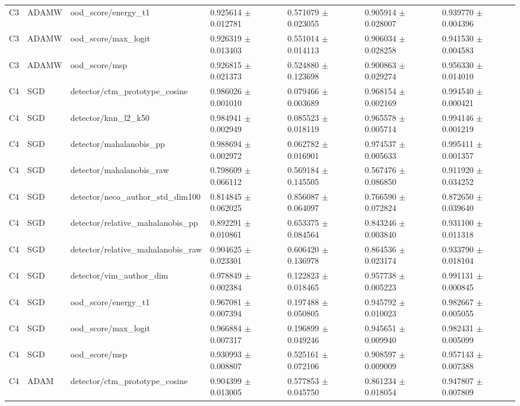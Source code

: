 \begin{longtable}{lllllll}
C3 & ADAMW & ood\_score/energy\_t1 & 0.925614 $\pm$ 0.012781 & 0.571079 $\pm$ 0.023055 & 0.905914 $\pm$ 0.028007 & 0.939770 $\pm$ 0.004396 \\
C3 & ADAMW & ood\_score/max\_logit & 0.926319 $\pm$ 0.013403 & 0.551014 $\pm$ 0.014113 & 0.906034 $\pm$ 0.028258 & 0.941530 $\pm$ 0.004583 \\
C3 & ADAMW & ood\_score/msp & 0.926815 $\pm$ 0.021373 & 0.524880 $\pm$ 0.123698 & 0.900863 $\pm$ 0.029274 & 0.956330 $\pm$ 0.014010 \\
C4 & SGD & detector/ctm\_prototype\_cosine & 0.986026 $\pm$ 0.001010 & 0.079466 $\pm$ 0.003689 & 0.968154 $\pm$ 0.002169 & 0.994540 $\pm$ 0.000421 \\
C4 & SGD & detector/knn\_l2\_k50 & 0.984941 $\pm$ 0.002949 & 0.085523 $\pm$ 0.018119 & 0.965578 $\pm$ 0.005714 & 0.994146 $\pm$ 0.001219 \\
C4 & SGD & detector/mahalanobis\_pp & 0.988694 $\pm$ 0.002972 & 0.062782 $\pm$ 0.016901 & 0.974537 $\pm$ 0.005633 & 0.995411 $\pm$ 0.001357 \\
C4 & SGD & detector/mahalanobis\_raw & 0.798609 $\pm$ 0.066112 & 0.569184 $\pm$ 0.145505 & 0.567476 $\pm$ 0.086850 & 0.911920 $\pm$ 0.034252 \\
C4 & SGD & detector/neco\_author\_std\_dim100 & 0.814845 $\pm$ 0.062025 & 0.856087 $\pm$ 0.064097 & 0.766590 $\pm$ 0.072824 & 0.872650 $\pm$ 0.039640 \\
C4 & SGD & detector/relative\_mahalanobis\_pp & 0.892291 $\pm$ 0.010861 & 0.653375 $\pm$ 0.084564 & 0.843246 $\pm$ 0.003840 & 0.931100 $\pm$ 0.011318 \\
C4 & SGD & detector/relative\_mahalanobis\_raw & 0.904625 $\pm$ 0.023301 & 0.606420 $\pm$ 0.136978 & 0.864536 $\pm$ 0.023174 & 0.933790 $\pm$ 0.018104 \\
C4 & SGD & detector/vim\_author\_dim & 0.978849 $\pm$ 0.002384 & 0.122823 $\pm$ 0.018465 & 0.957738 $\pm$ 0.005223 & 0.991131 $\pm$ 0.000845 \\
C4 & SGD & ood\_score/energy\_t1 & 0.967081 $\pm$ 0.007394 & 0.197488 $\pm$ 0.050805 & 0.945792 $\pm$ 0.010023 & 0.982667 $\pm$ 0.005055 \\
C4 & SGD & ood\_score/max\_logit & 0.966884 $\pm$ 0.007317 & 0.196899 $\pm$ 0.049246 & 0.945651 $\pm$ 0.009940 & 0.982431 $\pm$ 0.005099 \\
C4 & SGD & ood\_score/msp & 0.930993 $\pm$ 0.008807 & 0.525161 $\pm$ 0.072106 & 0.908597 $\pm$ 0.009009 & 0.957143 $\pm$ 0.007388 \\
C4 & ADAM & detector/ctm\_prototype\_cosine & 0.904399 $\pm$ 0.013005 & 0.577853 $\pm$ 0.045750 & 0.861234 $\pm$ 0.018054 & 0.947807 $\pm$ 0.007809 \\

\end{longtable}
